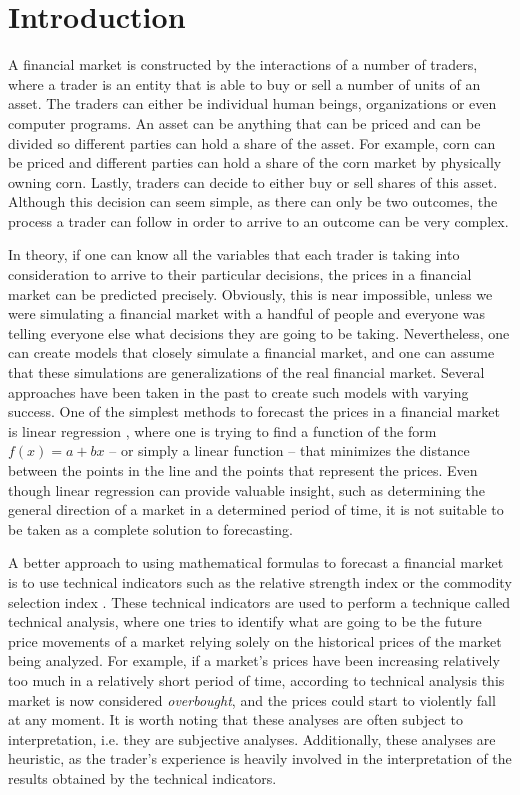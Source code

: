 \documentclass[review]{elsarticle}
\begin{document}
\linenumbers

\section{Introduction}
\label{section:introduction}

A financial market is constructed by the interactions of a number of traders, where a trader is an entity that is able to buy or sell a number of units of an asset. The traders can either be individual human beings, organizations or even computer programs. An asset can be anything that can be priced and can be divided so different parties can hold a share of the asset. For example, corn can be priced and different parties can hold a share of the corn market by physically owning corn. Lastly, traders can decide to either buy or sell shares of this asset. Although this decision can seem simple, as there can only be two outcomes, the process a trader can follow in order to arrive to an outcome can be very complex.

In theory, if one can know all the variables that each trader is taking into consideration to arrive to their particular decisions, the prices in a financial market can be predicted precisely. Obviously, this is near impossible, unless we were simulating a financial market with a handful of people and everyone was telling everyone else what decisions they are going to be taking. Nevertheless, one can create models that closely simulate a financial market, and one can assume that these simulations are generalizations of the real financial market. Several approaches have been taken in the past to create such models with varying success. One of the simplest methods to forecast the prices in a financial market is linear %
regression \cite{kutner2004applied}, where one is trying to find a function of the form $f(x) = a + bx$ -- or simply a linear function -- that minimizes the distance between the points in the line and the points that represent the prices. Even though linear regression can provide valuable insight, such as determining the general direction of a market in a determined period of time, it is not suitable to be taken as a complete solution to forecasting.

A better approach to using mathematical formulas to forecast a financial market is to use technical indicators such as the relative strength index or the commodity selection index \cite{Wilder1978}. These technical indicators are used to perform a technique called technical analysis, where one tries to identify what are going to be the future price movements of a market relying solely on the historical prices of the market being analyzed. For example, if a market's prices have been increasing relatively too much in a relatively short period of time, according to technical analysis this market is now considered \textit{overbought}, and the prices could start to violently fall at any moment. It is worth noting that these analyses are often subject to interpretation, i.e. they are subjective analyses. Additionally, these analyses are heuristic, as the trader's experience is heavily involved in the interpretation of the results obtained by the technical indicators.
\end{document}
